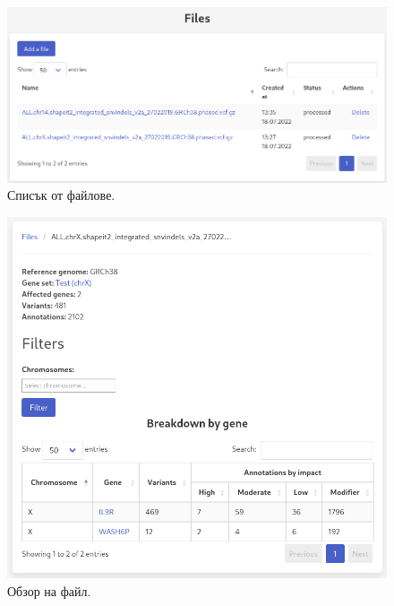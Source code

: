 \documentclass[pdftex,cyrillic,14pt,a4page,twoside,openright]{extreport}
\begin{document}
\begin{figure}[h]
  \centering
  \includegraphics[width=16cm]{figures/list_files}
  \caption {Списък от файлове.}
  \label{fig:list_files}
\end{figure}


\begin{figure}[ht]
  \centering
  \includegraphics[width=16cm]{figures/file_summary}
  \caption {Обзор на файл.}
  \label{fig:file_summary}
\end{figure}
\end{document}
